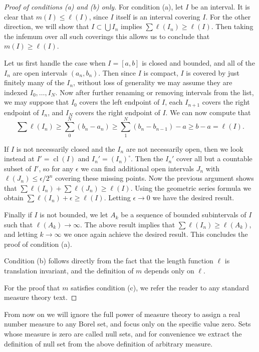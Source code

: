 \documentclass[11pt,oneside]{amsbook}
\DeclareMathOperator{\cl}{cl}
\theoremstyle{definition}
\theoremstyle{plain}
\theoremstyle{definition}
\theoremstyle{remark}
\begin{document}
\begin{proof}[Proof of conditions (a) and (b) only]
  For condition (a), let $I$ be an interval. It is clear that $m(I)\leq\ell(I)$, since $I$ itself is an interval covering $I$. For the other direction, we will show that $I\subset\bigcup I_n$ implies $\sum\ell(I_n)\geq\ell(I)$. Then taking the infemum over all such coverings this allows us to conclude that $m(I)\geq\ell(I)$.

  Let us first handle the case when $I=[a,b]$ is closed and bounded, and all of the $I_n$ are open intervals $(a_n,b_n)$. Then since $I$ is compact, $I$ is covered by just finitely many of the $I_n$, without loss of generality we may assume they are indexed $I_0,\ldots,I_N$. Now after further renaming or removing intervals from the list, we may suppose that $I_0$ covers the left endpoint of $I$, each $I_{n+1}$ covers the right endpoint of $I_n$, and $I_N$ covers the right endpoint of $I$. We can now compute that
\[\sum\ell(I_n)
\geq\sum_0^N(b_n-a_n)
\geq\sum_1^N(b_n-b_{n-1})-a
\geq b-a
= \ell(I)\text{.}
\]

  If $I$ is not necessarily closed and the $I_n$ are not necessarily open, then we look instead at $I'=\cl(I)$ and $I_n'=(I_n)^\circ$. Then the $I_n'$ cover all but a countable subset of $I'$, so for any $\epsilon$ we can find additional open intervals $J_n$ with $\ell(J_n)\leq\epsilon/2^n$ covering these missing points. Now the previous argument shows that $\sum\ell(I_n)+\sum\ell(J_n)\geq\ell(I)$. Using the geometric series formula we obtain $\sum\ell(I_n)+\epsilon\geq\ell(I)$. Letting $\epsilon\to0$ we have the desired result.

  Finally if $I$ is not bounded, we let $A_k$ be a sequence of bounded subintervals of $I$ such that $\ell(A_k)\to\infty$. The above result implies that $\sum\ell(I_n)\geq\ell(A_k)$, and letting $k\to\infty$ we once again achieve the desired result. This concludes the proof of condition (a).

  Condition (b) follows directly from the fact that the length function $\ell$ is translation invariant, and the definition of $m$ depends only on $\ell$.

  For the proof that $m$ satisfies condition (c), we refer the reader to any standard measure theory text.
\end{proof}

From now on we will ignore the full power of measure theory to assign a real number measure to any Borel set, and focus only on the specific value zero. Sets whose measure is zero are called null sets, and for convenience we extract the definition of null set from the above definition of arbitrary measure.
\end{document}
